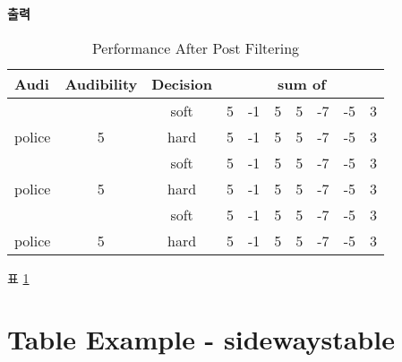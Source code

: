 \documentclass[12pt,a4paper]{report}
\begin{document}
		\textbf{출력}\\
		\vspace{-2.0em}
		\begin{table}[h]
			\caption{Performance After Post Filtering}
			\centering
			\begin{tabular}{ l c c rrrrrrr }
			\hline \hline
			Audi & Audibility & Decision & \multicolumn{7}{c}{ sum of }  \\ [0.5ex]
			\hline
			& 	& soft 	&  5 & -1 & 5  & 5 & -7 & -5 & 3 \\[-1.0ex]
			\raisebox{1.5ex} {police} & \raisebox{1.5ex} {5} 
				& hard	&  5 & -1 & 5  & 5 & -7 & -5 & 3 \\[1.0ex]
			& 	& soft 	&  5 & -1 & 5  & 5 & -7 & -5 & 3 \\[-1.0ex]
			\raisebox{4.0ex} {police} & \raisebox{2.0ex} {5} 
				& hard	&  5 & -1 & 5  & 5 & -7 & -5 & 3 \\[1.0ex]
			& 	& soft 	&  5 & -1 & 5  & 5 & -7 & -5 & 3 \\[-1.0ex]
			\raisebox{0.0ex} {police} & \raisebox{2.0ex} {5} 
				& hard	&  5 & -1 	& 5  & 5 & -7 & -5 & 3 \\[0.0ex]
			\hline
			\end{tabular}%
			\label{tab:PPer}%
		\end{table}%


표 \ref{tab:PPer}


\newpage
\section{Table Example - sidewaystable}
\end{document}
